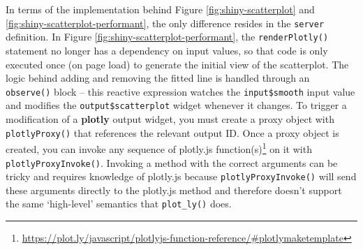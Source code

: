 \documentclass[
  12pt,
]{krantz}
\renewcommand{\href}[2]{#2\footnote{\url{#1}}}
\begin{document}
In terms of the implementation behind Figure \ref{fig:shiny-scatterplot} and \ref{fig:shiny-scatterplot-performant}, the only difference resides in the \texttt{server} definition. In Figure \ref{fig:shiny-scatterplot-performant}, the \texttt{renderPlotly()} statement no longer has a dependency on input values, so that code is only executed once (on page load) to generate the initial view of the scatterplot. The logic behind adding and removing the fitted line is handled through an \texttt{observe()} block -- this reactive expression watches the \texttt{input\$smooth} input value and modifies the \texttt{output\$scatterplot} widget whenever it changes. To trigger a modification of a \textbf{plotly} output widget, you must create a proxy object with \texttt{plotlyProxy()} that references the relevant output ID. Once a proxy object is created, you can invoke any sequence of \href{https://plot.ly/javascript/plotlyjs-function-reference/\#plotlymaketemplate}{plotly.js function(s)} on it with \texttt{plotlyProxyInvoke()}. Invoking a method with the correct arguments can be tricky and requires knowledge of plotly.js because \texttt{plotlyProxyInvoke()} will send these arguments directly to the plotly.js method and therefore doesn't support the same `high-level' semantics that \texttt{plot\_ly()} does.

\end{document}
